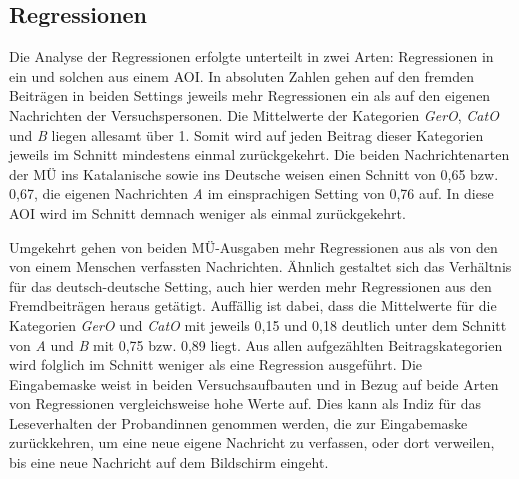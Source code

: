 
\subsection{Regressionen}
\label{K7:subsec:regressions}



Die Analyse der Regressionen erfolgte unterteilt in zwei Arten: Regressionen in ein und solchen aus einem AOI. In absoluten Zahlen gehen auf den fremden Beiträgen in beiden Settings jeweils mehr Regressionen ein als auf den eigenen Nachrichten der Versuchspersonen. Die Mittelwerte der Kategorien \emph{GerO}, \emph{CatO} und \emph{B} liegen allesamt über 1. Somit wird auf jeden Beitrag dieser Kategorien jeweils im Schnitt mindestens einmal zurückgekehrt. Die beiden Nachrichtenarten der MÜ ins Katalanische sowie ins Deutsche weisen einen Schnitt von 0,65 bzw. 0,67, die eigenen Nachrichten \emph{A} im einsprachigen Setting von 0,76 auf. In diese AOI wird im Schnitt demnach weniger als einmal zurückgekehrt.

Umgekehrt gehen von beiden MÜ-Ausgaben mehr Regressionen aus als von den von einem Menschen verfassten Nachrichten. Ähnlich gestaltet sich das Verhältnis für das deutsch-deutsche Setting, auch hier werden mehr Regressionen aus den Fremdbeiträgen heraus getätigt. Auffällig ist dabei, dass die Mittelwerte für die Kategorien \emph{GerO} und \emph{CatO} mit jeweils 0,15 und 0,18 deutlich unter dem Schnitt von \emph{A} und \emph{B} mit 0,75 bzw. 0,89 liegt. Aus allen aufgezählten Beitragskategorien wird folglich im Schnitt weniger als eine Regression ausgeführt. Die Eingabemaske weist in beiden Versuchsaufbauten und in Bezug auf beide Arten von Regressionen vergleichsweise hohe Werte auf. Dies kann als Indiz für das Leseverhalten der Proband{\textperiodcentered}innen genommen werden, die zur Eingabemaske zurückkehren, um eine neue eigene Nachricht zu verfassen, oder dort verweilen, bis eine neue Nachricht auf dem Bildschirm eingeht. 

